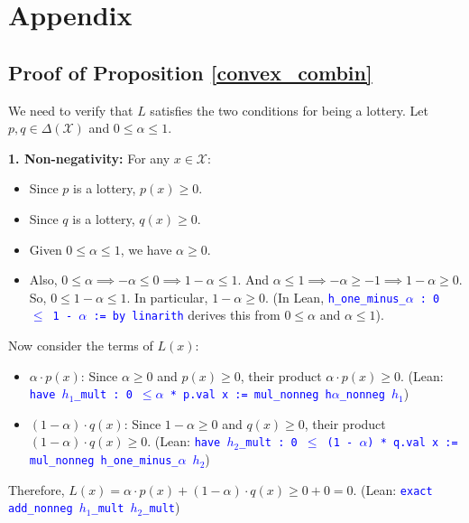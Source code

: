 \documentclass{article}
\theoremstyle{definition}
\newcommand{\X}{\mathcal{X}}
\newcommand{\tactic}[1]{\textcolor{blue}{\texttt{#1}}}
\newcommand{\DeltaX}{\Delta(\X)} %
\begin{document}
\newpage

\appendix

\section{Appendix}

\subsection{Proof of Proposition \ref{convex_combin}}\label{proof:convex_combin}
We need to verify that $L$ satisfies the two conditions for being a lottery.
Let $p, q \in \DeltaX$ and $0 \le \alpha \le 1$.

\textbf{1. Non-negativity:} For any $x \in \X$:
\begin{itemize}
    \item Since $p$ is a lottery, $p(x) \ge 0$.
    \item Since $q$ is a lottery, $q(x) \ge 0$.
    \item Given $0 \le \alpha \le 1$, we have $\alpha \ge 0$.
    \item Also, $0 \le \alpha \implies -\alpha \le 0 \implies 1-\alpha \le 1$. And $\alpha \le 1 \implies -\alpha \ge -1 \implies 1-\alpha \ge 0$. So, $0 \le 1-\alpha \le 1$. In particular, $1-\alpha \ge 0$.
    (In Lean, \tactic{h\_one\_minus\_$\alpha$ : 0 $\leq$ 1 - $\alpha$ := by linarith} derives this from $0 \le \alpha$ and $\alpha \le 1$).
\end{itemize}
Now consider the terms of $L(x)$:
\begin{itemize}
    \item $\alpha \cdot p(x)$: Since $\alpha \ge 0$ and $p(x) \ge 0$, their product $\alpha \cdot p(x) \ge 0$.
    (Lean: \tactic{have $h_1$\_mult : 0 $\leq\alpha$ * p.val x := mul\_nonneg h$\alpha$\_nonneg $h_1$})
    \item $(1-\alpha) \cdot q(x)$: Since $1-\alpha \ge 0$ and $q(x) \ge 0$, their product $(1-\alpha) \cdot q(x) \ge 0$.
    (Lean: \tactic{have $h_2$\_mult : 0 $\leq$ (1 - $\alpha$) * q.val x := mul\_nonneg h\_one\_minus\_$\alpha$ $h_2$})
\end{itemize}
Therefore, $L(x) = \alpha \cdot p(x) + (1-\alpha) \cdot q(x) \ge 0 + 0 = 0$.
(Lean: \tactic{exact add\_nonneg $h_1$\_mult $h_2$\_mult})
\end{document}
